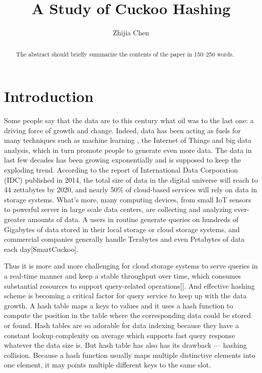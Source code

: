 \documentclass[runningheads]{llncs}
\begin{document}
%
\title{A Study of Cuckoo Hashing}
%
%
\author{Zhijia Chen}

\maketitle              %
%
\begin{abstract}
The abstract should briefly summarize the contents of the paper in
150--250 words.

\end{abstract}
%
%
%
\section{Introduction}
Some people say that the data are to this century what oil was to the last one: a driving force of growth and change. Indeed, data has been acting as fuels for many techniques such as machine learning , the Internet of Things and big data analysis, which in turn promote people to generate even more data. The data in last few decades has been growing exponentially and is supposed to keep the exploding trend. According to the report of International Data Corporation (IDC) published in 2014, the total size of data in the digital universe will reach to 44 zettabytes by 2020, and nearly 50\% of cloud-based services will rely on data in storage systems. What's more, many computing devices, from small IoT sensors to powerful server in large scale data centers, are collecting and analyzing ever-greater amounts of data. A users in routine generate queries on hundreds of Gigabytes of data stored in their local storage or cloud storage systems, and commercial companies generally handle Terabytes and even Petabytes of data each day[SmartCuckoo].

Thus it is more and more challenging for cloud storage systems to serve queries in a real-time manner and keep a stable throughput over time, which consumes substantial resources to support query-related operations[]. And effective hashing scheme is becoming a critical factor for query service to keep up with the data growth. A hash table maps a keys to values and it uses a hash function to compute the position in the table where the corresponding data could be stored or found. Hash tables are so adorable for data indexing because they have a constant lookup complexity on average which supports fast query response whatever the data size is. But hash table has also has its drawback --- hashing collision. Because a hash function usually maps multiple distinctive elements into one element, it may points multiple different keys to the same slot.
\end{document}
